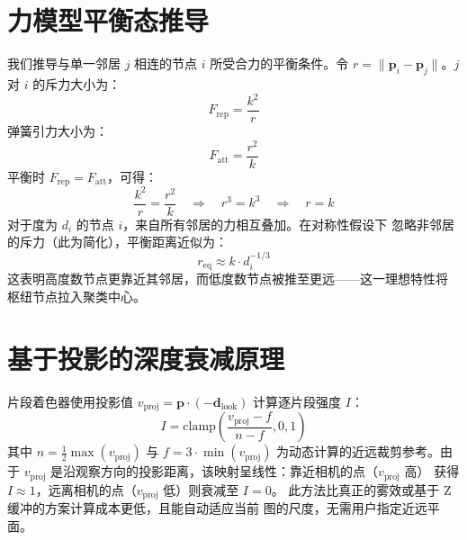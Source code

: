 \documentclass[11pt,a4paper]{report}
\begin{document}
\section{力模型平衡态推导}
\label{sec:app-force}
我们推导与单一邻居 $j$ 相连的节点 $i$ 所受合力的平衡条件。令
$r = \|\mathbf{p}_i - \mathbf{p}_j\|$。$j$ 对 $i$ 的斥力大小为：
\begin{equation}
    F_{\text{rep}}  = \frac{k^2}{r}
\end{equation}
弹簧引力大小为：
\begin{equation}
    F_{\text{att}}  = \frac{r^2}{k}
\end{equation}
平衡时 $F_{\text{rep}} = F_{\text{att}}$，可得：
\begin{equation}
    \frac{k^2}{r} = \frac{r^2}{k}
    \quad\Longrightarrow\quad
    r^3 = k^3
    \quad\Longrightarrow\quad
    r = k
\end{equation}
对于度为 $d_i$ 的节点 $i$，来自所有邻居的力相互叠加。在对称性假设下
忽略非邻居的斥力（此为简化），平衡距离近似为：
\begin{equation}
    r_{\text{eq}} \approx k \cdot d_i^{-1/3}
\end{equation}
这表明高度数节点更靠近其邻居，而低度数节点被推至更远——这一理想特性将
枢纽节点拉入聚类中心。
\section{基于投影的深度衰减原理}
\label{sec:app-depth}
片段着色器使用投影值 $v_{\text{proj}} = \mathbf{p} \cdot
(-\mathbf{d}_{\text{look}})$ 计算逐片段强度 $I$：
\begin{equation}
    I = \text{clamp}\left( \frac{v_{\text{proj}} - f}{n - f}, 0, 1 \right)
\end{equation}
其中 $n = \frac{1}{2}\max(v_{\text{proj}})$ 与 $f = 3 \cdot
\min(v_{\text{proj}})$ 为动态计算的近远裁剪参考。由于 $v_{\text{proj}}$
是沿观察方向的投影距离，该映射呈线性：靠近相机的点（$v_{\text{proj}}$ 高）
获得 $I \approx 1$，远离相机的点（$v_{\text{proj}}$ 低）则衰减至
$I = 0$。
此方法比真正的雾效或基于 Z 缓冲的方案计算成本更低，且能自动适应当前
图的尺度，无需用户指定近远平面。
\end{document}
